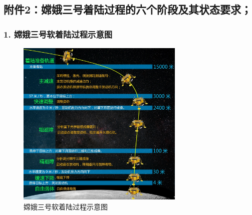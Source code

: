     \subsection{附件2：嫦娥三号着陆过程的六个阶段及其状态要求；}
        \subsubsection{1. 嫦娥三号软着陆过程示意图}
            \begin{figure}[H]
            \centering
            \includegraphics[width = 8cm]{images/Soft_landing_process.jpg}
            \caption{嫦娥三号软着陆过程示意图}
            \label{fig:嫦娥三号软着陆过程示意图}
            \end{figure}
